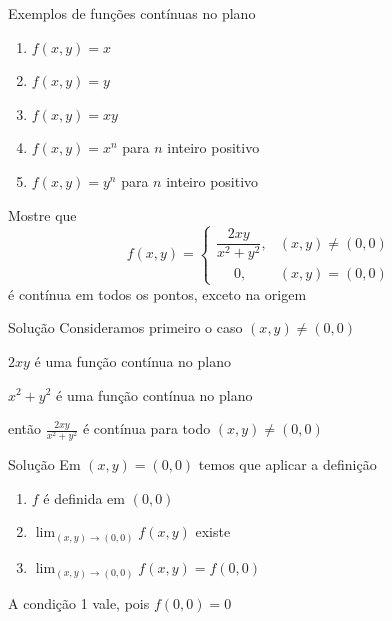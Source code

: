 \begin{question}
  Exemplos de funções contínuas no plano
  \begin{enumerate}[<+->]
    \item \(f(x, y) = x\)
    \item \(f(x, y) = y\)
    \item \(f(x, y) = xy\)
    \item \(f(x, y) = x^n\) para $n$ inteiro positivo
    \item \(f(x, y) = y^n\) para $n$ inteiro positivo
  \end{enumerate}
\end{question}

\begin{question}
  Mostre que
  \[
    f(x, y) =
    \begin{cases}
      \dfrac{2xy}{x^2+y^2}, & (x, y) \neq (0, 0) \\
      \quad\; 0,            & (x, y) =    (0, 0)
    \end{cases}
  \]
  é contínua em todos os pontos, exceto na origem
\end{question}

\begin{resolution}{Solução}
  Consideramos primeiro o caso \((x, y) \neq (0, 0)\)

  \pause
  \vspace{\baselineskip}
  \(2xy\) é uma função contínua no plano

  \pause
  \(x^2+y^2\) é uma função contínua no plano

  \pause
  então \(\frac{2xy}{x^2+y^2}\)
  \pause
  é contínua para todo \((x, y) \neq (0, 0)\)
\end{resolution}

\begin{resolution}{Solução}
  Em \((x, y) = (0, 0)\) temos que aplicar a definição

  \pause
  \vspace{0.5\baselineskip}
  \begin{enumerate}
    \setlength\itemsep{1.5em}
    \item \(f\) é definida em \((0, 0)\)
    \item \(\lim_{(x, y)\to(0, 0)} f(x, y)\) existe
    \item \(\lim_{(x, y)\to(0, 0)} f(x, y) = f(0, 0)\)
  \end{enumerate}

  \pause
  \vspace{\baselineskip}
  A condição 1 vale, pois \(f(0, 0) = 0\)
\end{resolution}


